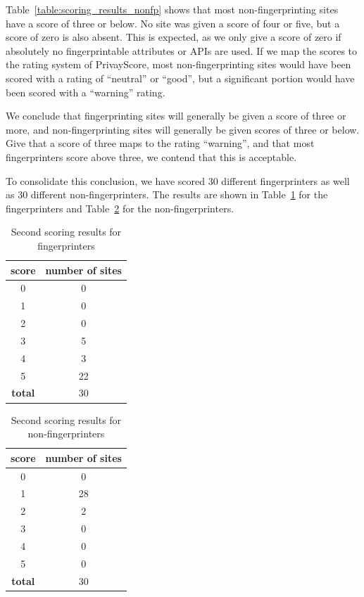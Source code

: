 \documentclass[
    fontsize=12pt,
    headings=small,
    parskip=half,
    bibliography=totoc,
    numbers=noenddot,
    open=any
    ]{scrreprt}
\begin{document}
Table~\ref{table:scoring_results_nonfp} shows that most non-fingerprinting sites
have a score of three or below.
No site was given a score of four or five, but a score of zero is also absent.
This is expected, as we only give a score of zero if absolutely no fingerprintable
attributes or APIs are used.
If we map the scores to the rating system of PrivayScore, most non-fingerprinting sites would
have been scored with a rating of ``neutral'' or ``good'', but a significant portion
would have been scored with a ``warning'' rating.

We conclude that fingerprinting sites will generally be given a score of three or more,
and non-fingerprinting sites will generally be given scores of three or below.
Give that a score of three maps to the rating ``warning'', and that most fingerprinters
score above three, we contend that this is acceptable.

To consolidate this conclusion, we have scored 30 different fingerprinters
as well as 30 different non-fingerprinters. The results are shown in Table~\ref{table:scoring_results_fp_2}
for the fingerprinters and Table~\ref{table:scoring_results_nonfp_2} for the non-fingerprinters.

\begin{table}
\centering
\caption{Second scoring results for fingerprinters}
\begin{tabular}{c c}
    \toprule
    \textbf{score} & \textbf{number of sites} \\
    \midrule
    0 & 0 \\
    1 & 0 \\
    2 & 0 \\
    3 & 5 \\
    4 & 3 \\
    5 & 22 \\
    \midrule
    \textbf{total} & 30 \\
    \bottomrule
\end{tabular}
\label{table:scoring_results_fp_2}
\end{table}

\begin{table}
\centering
\caption{Second scoring results for non-fingerprinters}
\begin{tabular}{c c}
    \toprule
    \textbf{score} & \textbf{number of sites} \\
    \midrule
    0 & 0 \\
    1 & 28 \\
    2 & 2 \\
    3 & 0 \\
    4 & 0 \\
    5 & 0 \\
    \midrule
    \textbf{total} & 30 \\
    \bottomrule
\end{tabular}
\label{table:scoring_results_nonfp_2}
\end{table}
\end{document}

